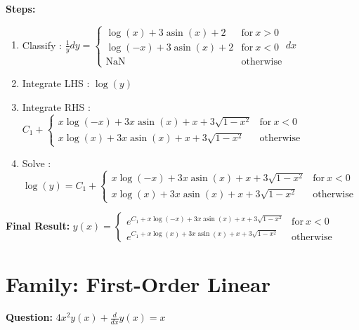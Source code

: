 \documentclass{article}
\begin{document}
\textbf{Steps:}
\begin{enumerate}
\item Classify :  $\frac{1}{y} dy = \begin{cases} \log{\left(x \right)} + 3 \operatorname{asin}{\left(x \right)} + 2 & \text{for}\: x > 0 \\\log{\left(- x \right)} + 3 \operatorname{asin}{\left(x \right)} + 2 & \text{for}\: x < 0 \\\text{NaN} & \text{otherwise} \end{cases} dx$
\item Integrate LHS :  $\log{\left(y \right)}$
\item Integrate RHS :  $C_{1} + \begin{cases} x \log{\left(- x \right)} + 3 x \operatorname{asin}{\left(x \right)} + x + 3 \sqrt{1 - x^{2}} & \text{for}\: x < 0 \\x \log{\left(x \right)} + 3 x \operatorname{asin}{\left(x \right)} + x + 3 \sqrt{1 - x^{2}} & \text{otherwise} \end{cases}$
\item Solve :  $\log{\left(y \right)} = C_{1} + \begin{cases} x \log{\left(- x \right)} + 3 x \operatorname{asin}{\left(x \right)} + x + 3 \sqrt{1 - x^{2}} & \text{for}\: x < 0 \\x \log{\left(x \right)} + 3 x \operatorname{asin}{\left(x \right)} + x + 3 \sqrt{1 - x^{2}} & \text{otherwise} \end{cases}$
\end{enumerate}
\textbf{Final Result:} $y{\left(x \right)} = \begin{cases} e^{C_{1} + x \log{\left(- x \right)} + 3 x \operatorname{asin}{\left(x \right)} + x + 3 \sqrt{1 - x^{2}}} & \text{for}\: x < 0 \\e^{C_{1} + x \log{\left(x \right)} + 3 x \operatorname{asin}{\left(x \right)} + x + 3 \sqrt{1 - x^{2}}} & \text{otherwise} \end{cases}$

\section*{Family: First-Order Linear}
\textbf{Question:} $4 x^{2} y{\left(x \right)} + \frac{d}{d x} y{\left(x \right)} = x$
\end{document}
